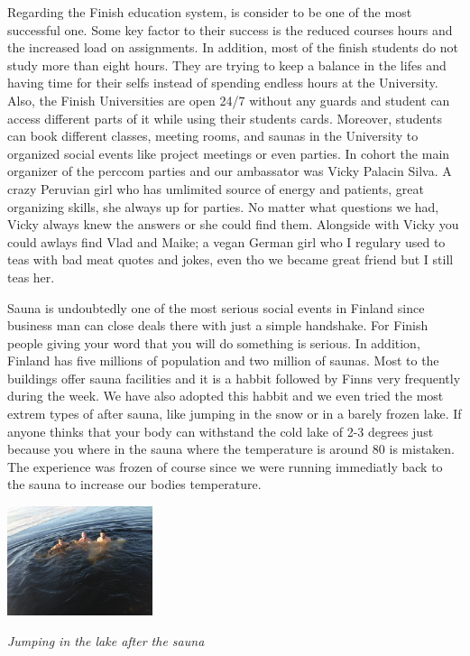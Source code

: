 \documentclass[10pt,a4paper]{article} %
\begin{document}
\begin{multicols}{3}
Regarding the Finish education system, is consider to be one of the most successful 
one. 
Some key factor to their success is the reduced courses hours and the increased 
load on assignments. 
In addition, most of the finish students do not study more than eight hours. 
They are trying to keep a balance in the lifes and having time for their selfs 
instead of spending endless hours at the University. 
Also, the Finish Universities are open 24/7 without any guards and student can 
access different parts of it while using their students cards. 
Moreover, students can book different classes, meeting rooms, and saunas 
in the University to organized social events like project meetings or even parties. 
In cohort the main organizer of the {\sc perccom} parties and our ambassator was 
Vicky Palacin Silva. 
A crazy Peruvian girl who has umlimited source of energy and patients, great 
organizing skills, she always up for parties. 
No matter what questions we had, Vicky always knew the answers or she could 
find them. 
Alongside with Vicky you could awlays find Vlad and Maike; a vegan German girl 
who I regulary used to teas with bad meat quotes and jokes, even tho we became 
great friend but I still teas her.


Sauna is undoubtedly one of the most serious social events in Finland since business 
man can close deals there with just a simple handshake. 
For Finish people giving your word that you will do something is serious. 
In addition, Finland has five millions of population and two million of saunas. 
Most to the buildings offer sauna facilities and it is a habbit followed by Finns 
very frequently during the week. 
We have also adopted this habbit and we even tried the most extrem types of after 
sauna, like jumping in the snow or in a barely frozen lake. 
If anyone thinks that your body can withstand the cold lake of 2-3 degrees just 
because you where in the sauna where the temperature is around 80 is mistaken. 
The experience was frozen of course since we were running immediatly back to the 
sauna to increase our bodies temperature.  


\begin{center}
	\includegraphics[width=0.32\textwidth]{media/after_sauna_lake.jpg}
	\par\textit{Jumping in the lake after the sauna}
\end{center}



\end{multicols}
\end{document}
